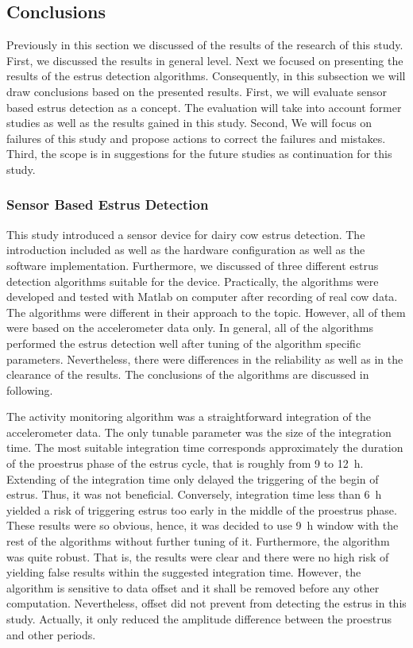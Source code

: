 \documentclass[english,12pt,a4paper,pdftex,elec,utf8]{aaltothesis}
\begin{document}
\subsection{Conclusions} \label{conclusionssection}

Previously in this section we discussed of the results of the research of this study. First, we discussed the results in general level. Next we focused on presenting the results of the estrus detection algorithms. Consequently, in this subsection we will draw conclusions based on the presented results. First, we will evaluate sensor based estrus detection as a concept. The evaluation will take into account former studies as well as the results gained in this study. Second, We will focus on failures of this study and propose actions to correct the failures and mistakes. Third, the scope is in suggestions for the future studies as continuation for this study.

\subsubsection{Sensor Based Estrus Detection}

This study introduced a sensor device for dairy cow estrus detection. The introduction included as well as the hardware configuration as well as the software implementation. Furthermore, we discussed of three different estrus detection algorithms suitable for the device. Practically, the algorithms were developed and tested with Matlab on computer after recording of real cow data. The algorithms were different in their approach to the topic. However, all of them were based on the accelerometer data only. In general, all of the algorithms performed the estrus detection well after tuning of the algorithm specific parameters. Nevertheless, there were differences in the reliability as well as in the clearance of the results. The conclusions of the algorithms are discussed in following.

The activity monitoring algorithm was a straightforward integration of the accelerometer data. The only tunable parameter was the size of the integration time. The most suitable integration time corresponds approximately the duration of the proestrus phase of the estrus cycle, that is roughly from 9 to \SI{12}{\hour}. Extending of the integration time only delayed the triggering of the begin of estrus. Thus, it was not beneficial. Conversely, integration time less than \SI{6}{\hour} yielded a risk of triggering estrus too early in the middle of the proestrus phase. These results were so obvious, hence, it was decided to use \SI{9}{\hour} window with the rest of the algorithms without further tuning of it. Furthermore, the algorithm was quite robust. That is, the results were clear and there were no high risk of yielding false results within the suggested integration time. However, the algorithm is sensitive to data offset and it shall be removed before any other computation. Nevertheless, offset did not prevent from detecting the estrus in this study. Actually, it only reduced the amplitude difference between the proestrus and other periods.
\end{document}
